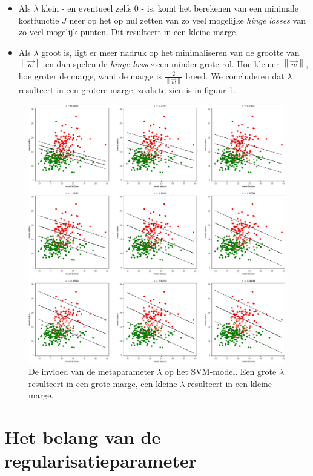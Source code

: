 \documentclass[twoside, kulak]{kulakreport}
\newcommand{\norm}[1]{\left\| #1 \right\|}
\begin{document}
	\begin{itemize}
		
		\item Als \(\lambda\) klein - en eventueel zelfs \(0\) - is, komt het berekenen van een minimale kostfunctie $J$ neer op het op nul zetten van zo veel mogelijke \textit{hinge losses} van zo veel mogelijk punten. Dit resulteert in een kleine marge. 
		
		\item Als \(\lambda\) groot is, ligt er meer nadruk op het minimaliseren van de grootte van \(\norm{\vec{w}}\) en dan spelen de \textit{hinge losses} een minder grote rol. Hoe kleiner \(\norm{\vec{w}}\), hoe groter de marge, want de marge is \(\frac{2}{\norm{\vec{w}}}\) breed. We concluderen dat \(\lambda\) resulteert in een grotere marge, zoals te zien is in figuur \ref{fig:lambda}.
		
	\end{itemize}
	
	\begin{figure}
		\centering
		\includegraphics[width=.9\textwidth]{lambda}
		\caption{De invloed van de metaparameter \(\lambda\) op het SVM-model. Een grote \(\lambda\) resulteert in een grote marge, een kleine \(\lambda\) resulteert in een kleine marge.}
		\label{fig:lambda}
	\end{figure}
	
	\section{Het belang van de regularisatieparameter}
	
\end{document}
